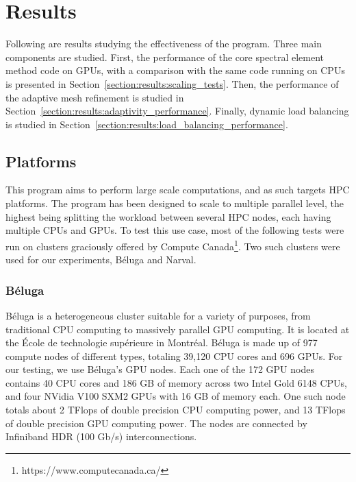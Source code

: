 \chapter{Results} \label{chapter:results}

Following are results studying the effectiveness of the program. Three main components are studied.
First, the performance of the core spectral element method code on GPUs, with a comparison with the
same code running on CPUs is presented in Section~\ref{section:results:scaling_tests}. Then, the
performance of the adaptive mesh refinement is studied in
Section~\ref{section:results:adaptivity_performance}. Finally, dynamic load balancing is studied in
Section~\ref{section:results:load_balancing_performance}.

\section{Platforms} \label{section:results:platforms}

This program aims to perform large scale computations, and as such targets HPC platforms. The
program has been designed to scale to multiple parallel level, the highest being splitting the
workload between several HPC nodes, each having multiple CPUs and GPUs. To test this use case,
most of the following tests were run on clusters graciously offered by Compute
Canada\footnote{https://www.computecanada.ca/}. Two such clusters were used for our experiments,
Béluga and Narval.

\subsection{Béluga} \label{section:results:platforms:beluga}

Béluga is a heterogeneous cluster suitable for a variety of purposes, from traditional CPU computing
to massively parallel GPU computing. It is located at the École de technologie supérieure in
Montréal. Béluga is made up of 977 compute nodes of different types, totaling 39,120 CPU cores and
696 GPUs. For our testing, we use Béluga's GPU nodes. Each one of the 172 GPU nodes contains 40 CPU
cores and 186 GB of memory across two Intel Gold 6148 CPUs, and four NVidia V100 SXM2 GPUs with 16
GB of memory each. One such node totals about 2 TFlops of double precision CPU computing power, and
13 TFlops of double precision GPU computing power. The nodes are connected by Infiniband HDR (100
Gb/s) interconnections.

